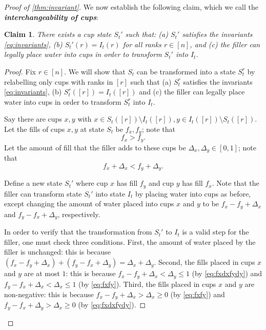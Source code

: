 \documentclass[twocolumn]{article}[10pt]
\newcommand{\defn}[1]{{\textit{\textbf{\boldmath #1}}}\xspace}
\newtheorem{clm}{Claim}
\begin{document}
\begin{proof}[Proof of \cref{thm:invariant}]
We now establish the following claim, which we call the \defn{interchangeability of cups}:
\begin{clm}
  \label{clm:interchangable}
  There exists a cup state $S_t'$ such that: (a) $S_t'$ satisfies the
  invariants \eqref{eq:invariants}, (b) $S_t'(r) = I_t(r)$ for all ranks
  $r\in[n]$, and (c) the filler can legally place water into cups in order to
  transform $S_t'$ into $I_t$. 
\end{clm}
\begin{proof}
  Fix $r \in [n]$. We will show that $S_t$ can be transformed into a state
  $S_t^r$ by relabelling only cups with ranks in $[r]$ such that (a) $S_t^r$
  satisfies the invariants \eqref{eq:invariants}, (b) $S_t^r([r]) = I_t([r])$
  and (c) the filler can legally place water into cups in order to transform
  $S_t^r$ into $I_t$.

Say there are cups $x, y$ with $x\in S_t([r]) \setminus I_t([r]), y \in
 I_t([r])\setminus S_t([r])$. Let the fills of cups $x,y$ at state $S_t$
 be $f_x, f_y$; note that 
 \begin{equation}
     f_x > f_y.
     \label{eq:fxfy}
 \end{equation} Let the amount of fill that the filler
 adds to these cups be $\Delta_x, \Delta_y \in [0,1]$; note that 
 \begin{equation}
 f_x +\Delta_x <f_y + \Delta_y.
 \label{eq:fxdxfydy}
 \end{equation}
 
Define a new state $S_t'$ where cup $x$ has fill $f_y$ and cup $y$ has fill
$f_x$. Note that the filler can transform state $S_t'$ into state $I_t$ by
placing water into cups as before, except changing the amount of water placed
into cups $x$ and $y$ to be  $f_x-f_y+\Delta_x$ and $f_y-f_x + \Delta_y$,
respectively.

In order to verify that the transformation from $S_t'$ to $I_t$ is a valid step
for the filler, one must check three conditions. First, the amount of water
placed by the filler is unchanged: this is because $(f_x-f_y + \Delta_x) +
(f_y-f_x+\Delta_y) = \Delta_x + \Delta_y$. Second, the fills placed in cups $x$
and $y$ are at most $1$: this is because $f_x-f_y+\Delta_x<\Delta_y \le 1$ (by
\eqref{eq:fxdxfydy}) and $f_y-f_x + \Delta_x < \Delta_x \le 1$ (by
\eqref{eq:fxfy}). Third, the fills placed in cups $x$ and $y$ are non-negative:
this is because $f_x-f_y + \Delta_x > \Delta_x \ge 0$ (by \eqref{eq:fxfy})
and $f_y-f_x+\Delta_y > \Delta_x \ge 0$ (by
\eqref{eq:fxdxfydy}). 


\end{proof}
\end{proof}
\end{document}
